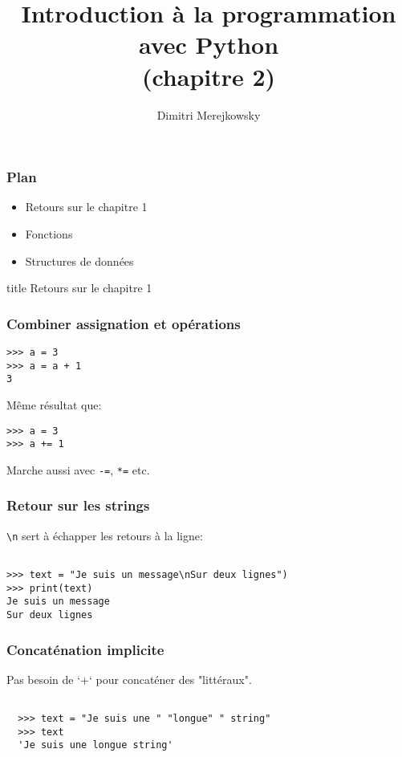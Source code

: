 \documentclass{beamer}
\title{Introduction à la programmation avec Python \\ (chapitre 2)}
\author{Dimitri Merejkowsky}
\institute{E2L}
\begin{document}
\frame{\titlepage}

\begin{frame}
\frametitle{Plan}

\begin{itemize}
  \item Retours sur le chapitre 1
  \item Fonctions
  \item Structures de données
\end{itemize}

\end{frame}


\begin{frame}[fragile]
  \centering
  \begin{beamercolorbox}[sep=8pt,center,shadow=true,rounded=true]{title}
    Retours sur le chapitre 1
  \end{beamercolorbox}
\end{frame}


\begin{frame}[fragile]
  \frametitle{Combiner assignation et opérations}

\begin{lstlisting}
>>> a = 3
>>> a = a + 1
3
\end{lstlisting}

Même résultat que:

\begin{lstlisting}
>>> a = 3
>>> a += 1
\end{lstlisting}

\vfill

Marche aussi avec \texttt{-=}, \texttt{*=} etc.

\end{frame}

\begin{frame}[fragile]
  \frametitle{Retour sur les strings}

\texttt{\textbackslash n} sert à échapper les retours à la ligne:

\begin{lstlisting}

>>> text = "Je suis un message\nSur deux lignes")
>>> print(text)
Je suis un message
Sur deux lignes
\end{lstlisting}

\end{frame}

\begin{frame}[fragile]
  \frametitle{Concaténation implicite}

Pas besoin de `+` pour concaténer des "littéraux".

\begin{lstlisting}

  >>> text = "Je suis une " "longue" " string"
  >>> text
  'Je suis une longue string'
\end{lstlisting}

\end{frame}
\end{document}

